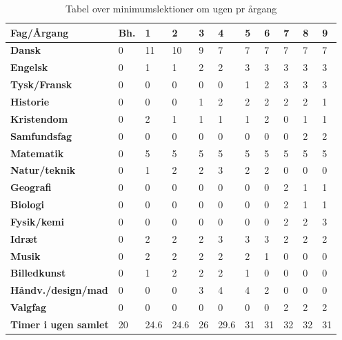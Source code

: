\begin{table}[h!]
\centering
\begin{tabular}{|l|l|l|l|l|l|l|l|l|l|l|}
\hline
\textbf{Fag/Årgang}                 & \textbf{Bh.} & \textbf{1} & \textbf{2} & \textbf{3} & \textbf{4} & \textbf{5} & \textbf{6} & \textbf{7} & \textbf{8} & \textbf{9} \\ \hline
\textbf{Dansk}                      & 0   & 11   & 10   & 9    & 7    & 7    & 7    & 7    & 7    & 7    \\ \hline
\textbf{Engelsk}                    & 0   & 1    & 1    & 2    & 2    & 3    & 3    & 3    & 3    & 3    \\ \hline
\textbf{Tysk/Fransk}                & 0   & 0    & 0    & 0    & 0    & 1    & 2    & 3    & 3    & 3    \\ \hline
\textbf{Historie}                   & 0   & 0    & 0    & 1    & 2    & 2    & 2    & 2    & 2    & 1    \\ \hline
\textbf{Kristendom}                 & 0   & 2    & 1    & 1    & 1    & 1    & 2    & 0    & 1    & 1    \\ \hline
\textbf{Samfundsfag}                & 0   & 0    & 0    & 0    & 0    & 0    & 0    & 0    & 2    & 2    \\ \hline
\textbf{Matematik}                  & 0   & 5    & 5    & 5    & 5    & 5    & 5    & 5    & 5    & 5    \\ \hline
\textbf{Natur/teknik}               & 0   & 1    & 2    & 2    & 3    & 2    & 2    & 0    & 0    & 0    \\ \hline
\textbf{Geografi}                   & 0   & 0    & 0    & 0    & 0    & 0    & 0    & 2    & 1    & 1    \\ \hline
\textbf{Biologi}                    & 0   & 0    & 0    & 0    & 0    & 0    & 0    & 2    & 1    & 1    \\ \hline
\textbf{Fysik/kemi}                 & 0   & 0    & 0    & 0    & 0    & 0    & 0    & 2    & 2    & 3    \\ \hline
\textbf{Idræt}                      & 0   & 2    & 2    & 2    & 3    & 3    & 3    & 2    & 2    & 2    \\ \hline
\textbf{Musik}                      & 0   & 2    & 2    & 2    & 2    & 2    & 1    & 0    & 0    & 0    \\ \hline
\textbf{Billedkunst}                & 0   & 1    & 2    & 2    & 2    & 1    & 0    & 0    & 0    & 0    \\ \hline
\textbf{Håndv./design/mad} & 0   & 0    & 0    & 3    & 4    & 4    & 2    & 0    & 0    & 0    \\ \hline
\textbf{Valgfag}                    & 0   & 0    & 0    & 0    & 0    & 0    & 0    & 2    & 2    & 2    \\ \hline
\textbf{Timer i ugen samlet}        & 20  & 24.6 & 24.6 & 26   & 29.6 & 31   & 31   & 32   & 32   & 31   \\ \hline
\end{tabular}
\caption{Tabel over minimumslektioner om ugen pr årgang}
\label{tab:lektioner_pr_uge}
\end{table}

